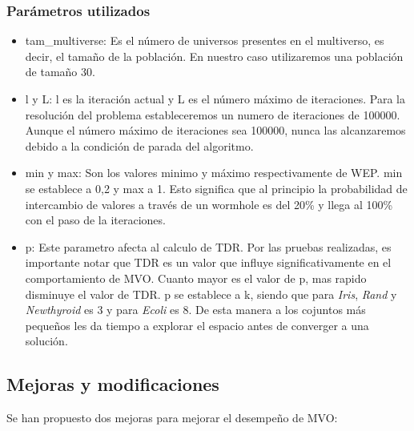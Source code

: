 \subsubsection{Parámetros utilizados}
\begin{itemize}
   \item tam\_multiverse: Es el número de universos presentes en el multiverso, es decir, el tamaño de la población. En nuestro caso utilizaremos una población de tamaño 30.
   \item l y L: l es la iteración actual y L es el número máximo de iteraciones. Para la resolución del problema estableceremos un numero de iteraciones de 100000. Aunque el número máximo de iteraciones sea 100000, nunca las alcanzaremos debido a la condición de parada del algoritmo.
   \item min y max: Son los valores minimo y máximo respectivamente de WEP. min se establece a 0,2 y max a 1. Esto significa que al principio la probabilidad de intercambio de valores a través de un wormhole es del 20\% y llega al 100\% con el paso de la iteraciones.
   \item p: Este parametro afecta al calculo de TDR. Por las pruebas realizadas, es importante notar que TDR es un valor que influye significativamente en el comportamiento de MVO. Cuanto mayor es el valor de p, mas rapido disminuye el valor de TDR. p se establece a k, siendo que para \emph{Iris}, \emph{Rand} y \emph{Newthyroid} es 3 y para \emph{Ecoli} es 8. De esta manera a los cojuntos más pequeños les da tiempo a explorar el espacio antes de converger a una solución.
\end{itemize}

\subsection{Mejoras y modificaciones}
Se han propuesto dos mejoras para mejorar el desempeño de MVO:

